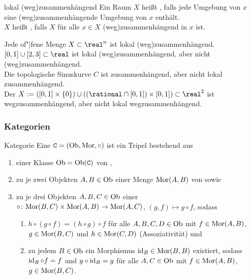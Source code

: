 \begin{Def}{lokal (weg)zusammenhängend}
    Ein Raum $X$ heißt , falls
    jede Umgebung von $x$ eine (weg)zusammenhängende Umgebung von $x$
    enthält. \\
    $X$ heißt , falls $X$ für alle
    $x \in X$ (weg)zusammenhängend in $x$ ist.
\end{Def}

\begin{Bsp}
    Jede of"|fene Menge $X \subset \real^n$ ist lokal (weg)zusammenhängend. \\
    $[0, 1] \cup [2, 3] \subset \real$ ist lokal (weg)zusammenhängend,
    aber nicht (weg)zusammenhängend. \\
    Die topologische Sinuskurve $C$ ist zusammenhängend,
    aber nicht lokal zusammenhängend. \\
    Der  $X := ([0, 1] \times \{0\}) \cup
    ((\rational \cap [0, 1]) \times [0, 1]) \subset \real^2$
    ist wegzusammenhängend, aber nicht lokal wegzusammenhängend.
\end{Bsp}

\pagebreak

\subsubsection{%
    Kategorien%
}

\begin{Def}{Kategorie}
    Eine  $\mathtt{C} = (\text{Ob}, \text{Mor}, \circ)$ ist ein Tripel
    bestehend aus
    \begin{enumerate}
        \item
        einer Klasse $\text{Ob} = \text{Ob}(\mathtt{C})$ von ,
        
        \item
        zu je zwei Objekten $A, B \in \text{Ob}$ einer Menge $\text{Mor}(A, B)$ von
         sowie
        
        \item
        zu je drei Objekten $A, B, C \in \text{Ob}$ einer  \\
        $\circ\colon \text{Mor}(B, C) \times \text{Mor}(A, B) \rightarrow \text{Mor}(A, C)$,
        $(g, f) \mapsto g \circ f$, sodass
        \begin{enumerate}
            \item
            $h \circ (g \circ f) = (h \circ g) \circ f$
            für alle $A, B, C, D \in \text{Ob}$ mit $f \in \text{Mor}(A, B)$,
            $g \in \text{Mor}(B, C)$ und $h \in \text{Mor}(C, D)$ (Assoziativität) und
            
            \item
            zu jedem $B \in \text{Ob}$ ein Morphismus $\operatorname{id}_B \in \text{Mor}(B, B)$
            existiert, sodass $\operatorname{id}_B \circ f = f$ und $g \circ \operatorname{id}_B = g$
            für alle $A, C \in \text{Ob}$ mit
            $f \in \text{Mor}(A, B)$, $g \in \text{Mor}(B, C)$.
        \end{enumerate}
    \end{enumerate}
\end{Def}

